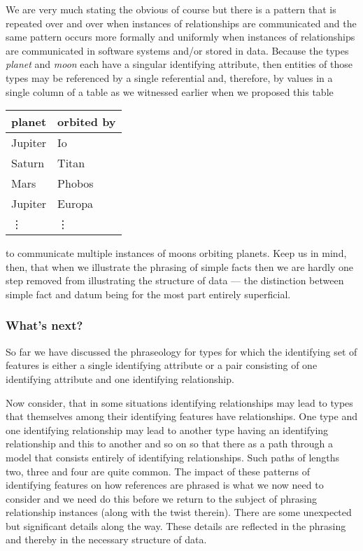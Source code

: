 \mynote
We are very much stating the obvious of course but there is a pattern that is repeated over and over when instances of relationships are communicated  and the same pattern occurs more formally  and uniformly when instances of relationships are communicated in software systems and/or stored in data.
Because 
the types \textit{planet} and \textit{moon} each have
a singular identifying attribute, then entities of those types 
may be referenced by a single referential and, therefore, by values in a
single column of a table as we witnessed earlier when we proposed this table
\begin{center}
\begin{tabular}{|l | l|}
\hline
planet & orbited by \\
\hline\hline
Jupiter  & Io \\
\hline
Saturn   & Titan    \\
\hline
Mars     & Phobos    \\
\hline
Jupiter  & Europa         \\
\hline
\vdots    & \vdots  \\
\hline
\end{tabular}
\end{center}
to communicate multiple instances of moons orbiting planets.
Keep us in mind, then, that when we illustrate the phrasing of simple facts then we are hardly one step removed from illustrating the structure of data --- the distinction between  simple fact and datum being for the most part entirely superficial. 

\subsubsection*{What's next?}
So far we have discussed the phraseology for  types for which the identifying set of features is either a single identifying attribute or a pair consisting of one identifying attribute and one identifying relationship. 

Now consider, that in some situations identifying relationships may lead to types that themselves among their identifying features have relationships.
One type and one identifying relationship may lead to another type
having an identifying relationship and this to another and so on so that there as a path through a model that consists entirely of identifying relationships. Such paths of lengths two, three and four are quite common. The impact of these patterns of identifying features 
on how references are phrased is what we now need to consider and we need do this before we return to the subject of phrasing relationship instances (along with the twist therein). There are some unexpected but significant details along the way. These details are reflected in the phrasing and thereby in the necessary structure of data. 

